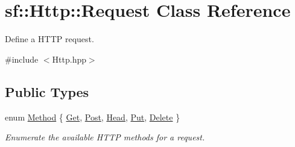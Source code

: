 \hypertarget{classsf_1_1_http_1_1_request}{}\section{sf\+:\+:Http\+:\+:Request Class Reference}
\label{classsf_1_1_http_1_1_request}


Define a H\+T\+TP request.  




{\ttfamily \#include $<$Http.\+hpp$>$}

\subsection*{Public Types}
\begin{DoxyCompactItemize}
\item 
enum \hyperlink{classsf_1_1_http_1_1_request_a620f8bff6f43e1378f321bf53fbf5598}{Method} \{ \newline
\hyperlink{classsf_1_1_http_1_1_request_a620f8bff6f43e1378f321bf53fbf5598ab822baed393f3d0353621e5378b9fcb4}{Get}, 
\hyperlink{classsf_1_1_http_1_1_request_a620f8bff6f43e1378f321bf53fbf5598ae8ec4048b9550f8d0747d4199603141a}{Post}, 
\hyperlink{classsf_1_1_http_1_1_request_a620f8bff6f43e1378f321bf53fbf5598a4df23138be7ed60f47aba6548ba65e7b}{Head}, 
\hyperlink{classsf_1_1_http_1_1_request_a620f8bff6f43e1378f321bf53fbf5598a523b94f9af069c1f35061d32011e2495}{Put}, 
\newline
\hyperlink{classsf_1_1_http_1_1_request_a620f8bff6f43e1378f321bf53fbf5598abc9555b94c1b896185015ec3990999f9}{Delete}
 \}\begin{DoxyCompactList}\small\item\em Enumerate the available H\+T\+TP methods for a request. \end{DoxyCompactList}
\end{DoxyCompactItemize}
